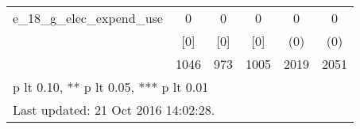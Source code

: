 \begin{table}[htbp]
\begin{tabular*}{0.9\hsize}{@{\hskip\tabcolsep\extracolsep\fill}l*{1}{ccccc}}
e\_18\_g\_elec\_expend\_use          &        0&        0&        0&        0         &        0         \\
                                &      [0]&      [0]&      [0]&      (0)         &      (0)         \\
                                &     1046&      973&     1005&     2019         &     2051         \\
\bottomrule
\multicolumn{6}{l}{\footnotesize * p lt 0.10, ** p lt 0.05, *** p lt 0.01}\\
\multicolumn{6}{l}{\footnotesize Last updated: 21 Oct 2016 14:02:28.}\\
\end{tabular*}
\end{table}
